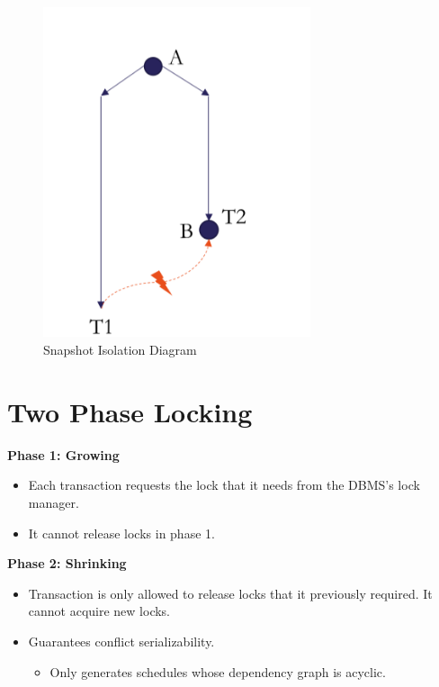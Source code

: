 \documentclass{article}
\begin{document}
\begin{figure}[h]
    \centering
    \includegraphics[width=0.7\textwidth]{assets/snapshot_isolation.png}
    \caption{Snapshot Isolation Diagram}
\end{figure}

\section*{Two Phase Locking}
\textbf{Phase 1: Growing}
\begin{itemize}
    \item Each transaction requests the lock that it needs from the DBMS's lock manager.
    \item It cannot release locks in phase 1.
\end{itemize}

\textbf{Phase 2: Shrinking}
\begin{itemize}
    \item Transaction is only allowed to release locks that it previously required. It
          cannot acquire new locks.
    \item Guarantees conflict serializability.
          \begin{itemize}
              \item Only generates schedules whose dependency graph is acyclic.
          \end{itemize}
\end{itemize}
\end{document}

